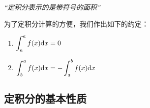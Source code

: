 \begin{center}
	
	{\b\it “定积分表示的是带符号的面积” }
\end{center}

为了定积分计算的方便，我们作出如下的约定：
\begin{thx}
	\begin{enumerate}
	  \item $\displaystyle\int_a^af(x)\mathrm{d} x=0$
	  \item $\displaystyle\int_b^af(x)\mathrm{d} x=-\displaystyle\int_a^bf(x)\mathrm{d} x$ 
	\end{enumerate}
\end{thx}

\subsection{定积分的基本性质}

